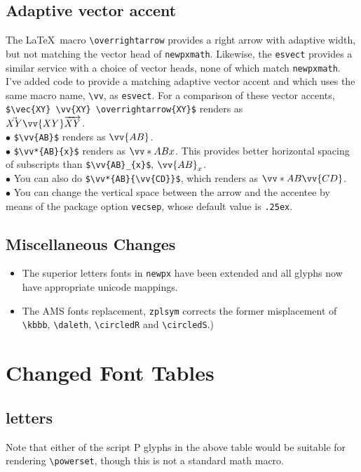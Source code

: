 \documentclass[11pt]{article}
\theoremstyle{oldplain}
\theoremstyle{plain}
\begin{document}
\subsection{Adaptive vector accent} The \LaTeX\ macro \verb|\overrightarrow| provides a right arrow with adaptive width, but not matching the vector head of {\tt newpxmath}. Likewise, the {\tt esvect} provides a similar service with a choice of vector heads, none of which match {\tt newpxmath}. I've added code to provide a matching adaptive vector accent and which uses the same macro name, \verb|\vv|, as {\tt esvect}.
For a comparison of these vector accents, \verb|$\vec{XY} \vv{XY} \overrightarrow{XY}$| renders as\\ 
$\vec{XY} \vv{XY} \overrightarrow{XY}$.\\ 
$\bullet$ \verb|$\vv{AB}$|  renders as $\vv{AB}$.\\ 
$\bullet$ \verb|$\vv*{AB}{x}$| renders as $\vv*{AB}{x}$. This provides better horizontal spacing of subscripts than \verb|$\vv{AB}_{x}$|, $\vv{AB}_{x}$.\\
$\bullet$  You can also do \verb|$\vv*{AB}{\vv{CD}}$|, which  renders as $\vv*{AB}{\vv{CD}}$.\\
$\bullet$ You can change the vertical space between the arrow and the accentee by means of the package option {\tt vecsep}, whose default value is {\tt .25ex}.

\subsection{Miscellaneous Changes}
\begin{itemize}
\item
The superior letters fonts in {\tt newpx} 
have been extended and all glyphs now have appropriate unicode mappings.
\item
The AMS fonts replacement, {\tt zplsym} corrects the former misplacement of \verb|\kbbb|, \verb|\daleth|, \verb|\circledR| and \verb|\circledS|.)
\end{itemize}
\newpage
\section{Changed Font Tables}
\subsection{letters}

Note that either of the script P glyphs  in the above table would be suitable for rendering \verb|\powerset|, though this is not a standard math macro.
\newpage  
\end{document}
